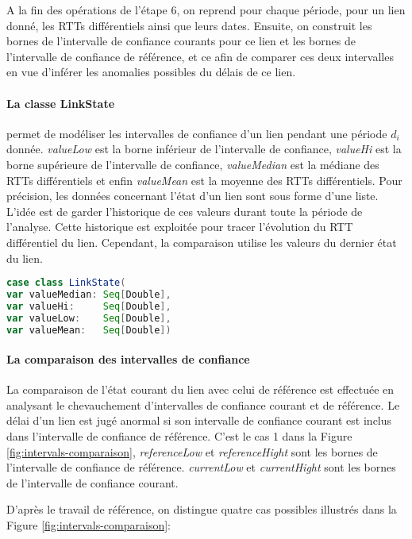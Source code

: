 A la fin des opérations de l'étape 6, on reprend pour chaque période, pour un lien donné, les RTTs différentiels ainsi que leurs dates. Ensuite, on construit les bornes de l'intervalle de confiance courants pour ce lien et les bornes de l'intervalle de confiance de référence, et ce afin de comparer ces deux intervalles en vue d'inférer les anomalies possibles du délais de ce lien.


\paragraph{La classe LinkState } permet de modéliser les intervalles de confiance d'un lien pendant une période $d_i$ donnée. \textit{valueLow} est la borne inférieur de l'intervalle de confiance, \textit{valueHi} est la borne supérieure de l'intervalle de confiance, \textit{valueMedian} est la médiane des RTTs différentiels et enfin \textit{valueMean} est la moyenne des RTTs différentiels. Pour précision, les données concernant l'état d'un lien sont sous forme d'une liste. L'idée est de garder l'historique de ces valeurs durant toute la période de l'analyse. Cette historique est exploitée pour tracer l'évolution du RTT différentiel du lien. Cependant, la comparaison utilise les valeurs du dernier état du lien.

  

\begin{lstlisting}[language=scala]
case class LinkState(
var valueMedian: Seq[Double],
var valueHi:     Seq[Double],
var valueLow:    Seq[Double],
var valueMean:   Seq[Double])
\end{lstlisting}
\paragraph{La comparaison des intervalles de confiance} 

La comparaison de l'état courant du lien avec celui de référence est effectuée en analysant le chevauchement d'intervalles de confiance  courant et de référence. Le délai d'un lien est jugé anormal si son intervalle de confiance courant est inclus dans l'intervalle de confiance de référence. C'est le cas 1 dans la Figure 	\ref{fig:intervals-comparaison},  \textit{referenceLow} et \textit{referenceHight} sont les bornes de l'intervalle de confiance de référence.  \textit{currentLow} et \textit{currentHight} sont les bornes de l'intervalle de confiance courant.

D'après le travail de référence, on distingue quatre cas possibles  illustrés dans la Figure 	\ref{fig:intervals-comparaison}:

